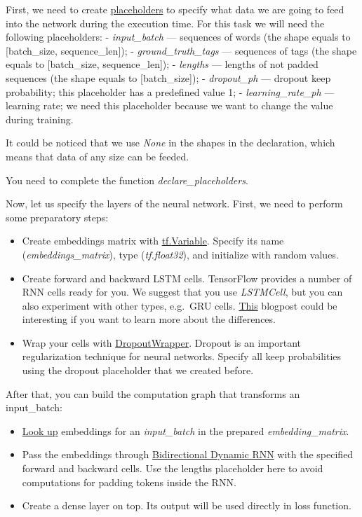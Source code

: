 \documentclass[11pt]{article}
\providecommand{\tightlist}{%
      \setlength{\itemsep}{0pt}\setlength{\parskip}{0pt}}
\begin{document}
    First, we need to create
\href{https://www.tensorflow.org/api_docs/python/tf/compat/v1/placeholder}{placeholders}
to specify what data we are going to feed into the network during the
execution time. For this task we will need the following placeholders: -
\emph{input\_batch} --- sequences of words (the shape equals to
{[}batch\_size, sequence\_len{]}); - \emph{ground\_truth\_tags} ---
sequences of tags (the shape equals to {[}batch\_size,
sequence\_len{]}); - \emph{lengths} --- lengths of not padded sequences
(the shape equals to {[}batch\_size{]}); - \emph{dropout\_ph} ---
dropout keep probability; this placeholder has a predefined value 1; -
\emph{learning\_rate\_ph} --- learning rate; we need this placeholder
because we want to change the value during training.

It could be noticed that we use \emph{None} in the shapes in the
declaration, which means that data of any size can be feeded.

You need to complete the function \emph{declare\_placeholders}.

    Now, let us specify the layers of the neural network. First, we need to
perform some preparatory steps:

\begin{itemize}
\tightlist
\item
  Create embeddings matrix with
  \href{https://www.tensorflow.org/api_docs/python/tf/Variable}{tf.Variable}.
  Specify its name (\emph{embeddings\_matrix}), type
  (\emph{tf.float32}), and initialize with random values.
\item
  Create forward and backward LSTM cells. TensorFlow provides a number
  of RNN cells ready for you. We suggest that you use \emph{LSTMCell},
  but you can also experiment with other types, e.g.~GRU cells.
  \href{http://colah.github.io/posts/2015-08-Understanding-LSTMs/}{This}
  blogpost could be interesting if you want to learn more about the
  differences.
\item
  Wrap your cells with
  \href{https://www.tensorflow.org/api_docs/python/tf/contrib/rnn/DropoutWrapper}{DropoutWrapper}.
  Dropout is an important regularization technique for neural networks.
  Specify all keep probabilities using the dropout placeholder that we
  created before.
\end{itemize}

After that, you can build the computation graph that transforms an
input\_batch:

\begin{itemize}
\tightlist
\item
  \href{https://www.tensorflow.org/api_docs/python/tf/nn/embedding_lookup}{Look
  up} embeddings for an \emph{input\_batch} in the prepared
  \emph{embedding\_matrix}.
\item
  Pass the embeddings through
  \href{https://www.tensorflow.org/api_docs/python/tf/nn/bidirectional_dynamic_rnn}{Bidirectional
  Dynamic RNN} with the specified forward and backward cells. Use the
  lengths placeholder here to avoid computations for padding tokens
  inside the RNN.
\item
  Create a dense layer on top. Its output will be used directly in loss
  function.
\end{itemize}
\end{document}
